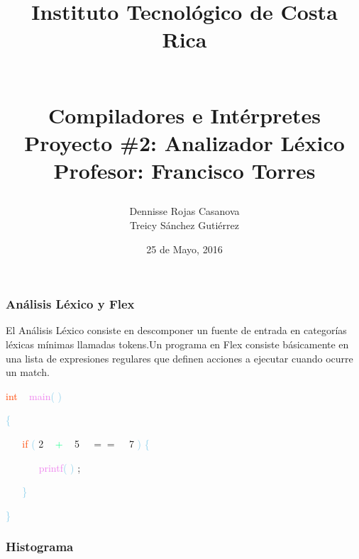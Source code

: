 \documentclass[10, usernames, dvipsnames]{beamer}
\begin{document}
 
\title{
\begin{LARGE}
Instituto Tecnol\'ogico de Costa Rica
\end{LARGE}
\newline
\begin{Large}
\\Compiladores e Int\'erpretes
\\Proyecto \#2: Analizador L\'exico
\\Profesor: Francisco Torres
\end{Large}
}
\author{Dennisse Rojas Casanova
\\Treicy S\'anchez Guti\'errez}
\date{25 de Mayo, 2016}
\maketitle 
\begin{frame} 
\frametitle{An\'alisis L\'exico y Flex} 
El An\'alisis L\'exico consiste en descomponer un fuente de entrada en categor\'ias l\'exicas m\'inimas llamadas tokens.Un programa en Flex consiste b\'asicamente en una lista de expresiones regulares que definen acciones a ejecutar cuando ocurre un match.\end{frame} 
\begin{frame}
\textcolor{OrangeRed}{int}
\textcolor{White}{\ }
\textcolor{Violet}{main}\textcolor{SkyBlue}{(}
\textcolor{SkyBlue}{)}

 \textcolor{SkyBlue}{\{ }

 \textcolor{White}{\ }
\textcolor{White}{\ }
\textcolor{OrangeRed}{if}
\textcolor{SkyBlue}{(}
\textcolor{RedViolet}{2}
\textcolor{White}{\ }
\textcolor{SpringGreen}{+}
\textcolor{White}{\ }
\textcolor{RedViolet}{5}
\textcolor{White}{\ }
\textcolor{OliveGreen}{$==$}
\textcolor{White}{\ }
\textcolor{RedViolet}{7}
\textcolor{SkyBlue}{)}
\textcolor{SkyBlue}{\{ }

 \textcolor{White}{\ }
\textcolor{White}{\ }
\textcolor{White}{\ }
\textcolor{White}{\ }
\textcolor{Violet}{printf}\textcolor{SkyBlue}{(}
\textcolor{Orchid}{}
\textcolor{SkyBlue}{)}
\textcolor{Sepia}{;}

 \textcolor{White}{\ }
\textcolor{White}{\ }
\textcolor{SkyBlue}{\} }

 \textcolor{SkyBlue}{\} }

 \end{frame}
\begin{frame} 
\frametitle{Histograma} 
\end{frame}
\end{document}

